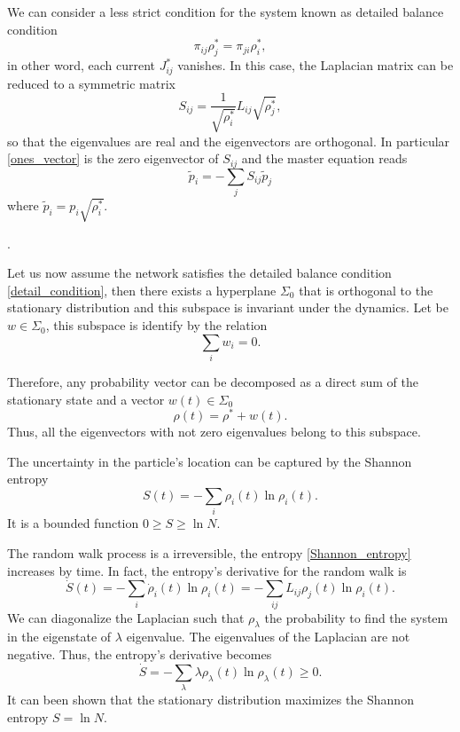 We can consider a less strict condition for the system known as detailed balance condition
\begin{equation}\label{detail_condition}
    \pi_{ij} \rho_j^* = \pi_{ji} \rho_i^*,
\end{equation}
in other word, each current $J^*_{ij}$ vanishes.
In this case, the Laplacian matrix can be reduced to a symmetric matrix 
\begin{equation}
    S_{ij}=\frac{1}{\sqrt{\rho_i^\ast}}L_{ij}\sqrt{\rho_j^\ast},
\end{equation}
so that the eigenvalues are real and the eigenvectors are orthogonal. In particular \eqref{ones_vector} is the zero eigenvector of $S_{ij}$ and the master equation reads 
\begin{equation}
    \tilde p_i=-\sum_j S_{ij} \tilde p_j
\end{equation}
where $\tilde p_i=p_i\sqrt{\rho_i^\ast}$. 

.

Let us now assume the network satisfies the detailed balance condition \eqref{detail_condition}, then there exists a hyperplane $\Sigma_0$ that is orthogonal to the stationary distribution and this subspace is invariant under the dynamics. Let be $w \in \Sigma_0$, this subspace is identify by the relation
\begin{equation}
    \sum_i w_i = 0.
\end{equation}


Therefore, any probability vector can be decomposed as a direct sum of the stationary state and a vector $w(t) \in \Sigma_0$ 
\begin{equation}
    \rho(t) = \rho^* + w(t).
\end{equation}
Thus, all the eigenvectors with not zero eigenvalues belong to this subspace.


The uncertainty in the particle's location can be captured by the Shannon entropy
\begin{equation}\label{Shannon_entropy}
    S(t) = -\sum_i \rho_i(t)\ln \rho_i(t).
\end{equation}
It is a bounded function $0\geq S \geq \ln N$.

The random walk process is a irreversible, the entropy \eqref{Shannon_entropy} increases by time. 
In fact, the entropy's derivative for the random walk is
\begin{equation}
        \dot S(t) = -\sum_i \dot\rho_i(t)\ln \rho_i(t) = -\sum_{ij} L_{ij} \rho_j(t)\ln \rho_i(t).
\end{equation}
We can diagonalize the Laplacian such that $\rho_\lambda$ the probability to find the system in the eigenstate of $\lambda$ eigenvalue.
The eigenvalues of the Laplacian are not negative. Thus, the entropy's derivative becomes
\begin{equation}
    \dot S = -\sum_\lambda \lambda \rho_\lambda(t) \ln \rho_\lambda(t) \geq 0.
\end{equation}
It can been shown that the stationary distribution maximizes the Shannon entropy $S = \ln N$.

